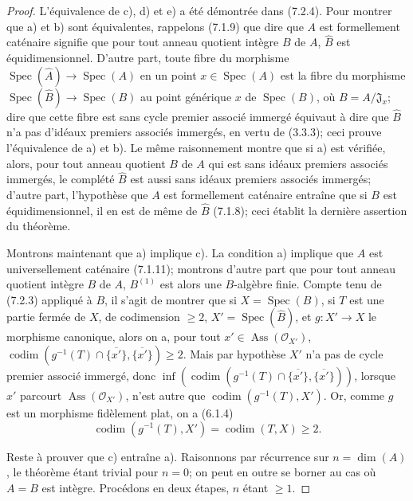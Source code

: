 \begin{proof}
L'équivalence de c), d) et e) a été démontrée dans (7.2.4). Pour montrer
que a) et b) sont équivalentes, rappelons (7.1.9) que dire que $A$ est
formellement caténaire signifie que pour tout anneau quotient intègre $B$
de $A$, $\widehat B$ est équidimensionnel. D'autre part, toute fibre du
morphisme $\operatorname{Spec}(\widehat A)\to\operatorname{Spec}(A)$ en un
point $x\in\operatorname{Spec}(A)$ est la fibre du morphisme
$\operatorname{Spec}(\widehat B)\to\operatorname{Spec}(B)$ au point
générique $x$ de $\operatorname{Spec}(B)$, où
$B=A/\mathfrak J_x$; dire que cette fibre est sans cycle premier associé
immergé équivaut à dire que $\widehat B$ n'a pas d'idéaux premiers associés
immergés, en vertu de (3.3.3); ceci prouve l'équivalence de a) et b). Le
même raisonnement montre que si a) est vérifiée, alors, pour tout anneau
quotient $B$ de $A$ qui est sans idéaux premiers associés immergés, le
complété $\widehat B$ est aussi sans idéaux premiers associés immergés;
d'autre part, l'hypothèse que $A$ est formellement caténaire entraîne que
si $B$ est équidimensionnel, il en est de même de $\widehat B$ (7.1.8);
ceci établit la dernière assertion du théorème.

Montrons maintenant que a) implique c). La condition a) implique que $A$
est universellement caténaire (7.1.11); montrons d'autre part que pour tout
anneau quotient intègre $B$ de $A$, $B^{(1)}$ est alors une $B$-algèbre
finie. Compte tenu de (7.2.3) appliqué à $B$, il s'agit de montrer que si
$X=\operatorname{Spec}(B)$, si $T$ est une partie fermée de $X$, de
codimension $\geqslant2$, $X'=\operatorname{Spec}(\widehat B)$, et
$g:X'\to X$ le morphisme canonique, alors on a, pour tout
$x'\in\operatorname{Ass}(\mathscr O_{X'})$,
$\operatorname{codim}(g^{-1}(T)\cap\overline{\{x'\}},
\overline{\{x'\}})\geqslant2$.
Mais par hypothèse $X'$ n'a pas de cycle premier associé immergé, donc
$\inf(\operatorname{codim}(g^{-1}(T)\cap\overline{\{x'\}},
\overline{\{x'\}}))$, lorsque $x'$ parcourt
$\operatorname{Ass}(\mathscr O_{X'})$, n'est autre que
$\operatorname{codim}(g^{-1}(T),X')$.
Or, comme $g$ est un morphisme fidèlement plat, on a (6.1.4)
\[
\operatorname{codim}(g^{-1}(T),X')=\operatorname{codim}(T,X)\geqslant2.
\]


Reste à prouver que c) entraîne a). Raisonnons par récurrence sur
$n=\dim(A)$, le théorème étant trivial pour $n=0$; on peut en outre se
borner au cas où $A=B$ est intègre. Procédons en deux étapes, $n$ étant
$\geqslant1$.


\end{proof}

